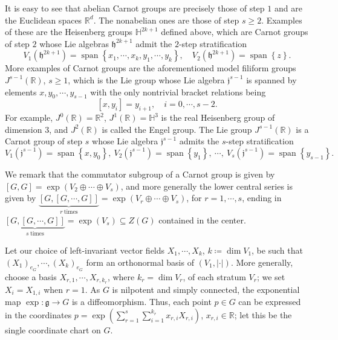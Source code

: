\documentclass[11pt,reqno]{amsart}
\newcommand{\1}{\mathbf 1}
\begin{document}
It is easy to see that abelian Carnot groups are precisely those of step $1$ and are the Euclidean spaces $\mathbb{R}^d$. The nonabelian ones are those of step $s\ge 2$. Examples of these are the Heisenberg groups $\mathbb{H}^{2k+1}$ defined above, which are Carnot groups of step $2$ whose Lie algebras $\mathfrak{h}^{2k+1}$ admit the $2$-step stratification
\[
V_1\left(\mathfrak{h}^{2k+1}\right)=\operatorname{span}\left\{x_1,\cdots,x_k,y_1,\cdots,y_k\right\}, \quad V_2\left(\mathfrak{h}^{2k+1}\right)=\operatorname{span}\left\{z\right\}.
\]
More examples of Carnot groups are the aforementioned model filiform groups $J^{s-1}\left(\mathbb{R}\right)$, $s\ge 1$,  which is the Lie group whose Lie algebra $\mathfrak{j}^{s-1}$ is spanned by elements $x,y_0,\cdots,y_{s-1}$ with the only nontrivial bracket relations being
\[
\left[x,y_i\right]=y_{i+1},\quad i=0,\cdots,s-2.
\]
For example, $J^0\left(\mathbb{R}\right)=\mathbb{R}^2$, $J^1\left(\mathbb{R}\right)= \mathbb{H}^3$ is the real Heisenberg group of dimension $3$, and $J^2\left(\mathbb{R}\right)$ is called the Engel group. The Lie group $J^{s-1}\left(\mathbb{R}\right)$ is a Carnot group of step $s$ whose Lie algebra $\mathfrak{j}^{s-1}$ admits the $s$-step stratification
\[
V_1\left(\mathfrak{j}^{s-1}\right)=\operatorname{span}\left\{x,y_0\right\},~ V_2\left(\mathfrak{j}^{s-1}\right)=\operatorname{span}\left\{y_1\right\}, ~\cdots,~ V_s\left(\mathfrak{j}^{s-1}\right)=\operatorname{span}\left\{y_{s-1}\right\}.
\]

We remark that the commutator subgroup of a Carnot group is given by $\left[G,G\right]=\exp\left(V_2\oplus\cdots\oplus V_s\right)$, and more generally the lower central series is given by  $\underbrace{\left[G,\left[G,\cdots,G\right]\right]}_{r~\mathrm{times}}=\exp\left(V_r\oplus\cdots\oplus V_s\right)$, for $r=1,\cdots,s$, ending in $\underbrace{\left[G,\left[G,\cdots,G\right]\right]}_{s~\mathrm{times}}=\exp\left(V_s\right)\subseteq Z\left(G\right)$ contained in the center. 

Let our choice of left-invariant vector fields $X_1,\cdots,X_k$, $k\coloneqq \operatorname{dim}V_1$, be such that $\left(X_1\right)_{e_G},\cdots, \left(X_k\right)_{e_G}$ form an orthonormal basis of $\left(V_1,\left|\cdot \right|\right)$. More generally, choose a basis $X_{r,1},\cdots, X_{r,k_r}$, where $k_r=\dim V_r$, of each stratum $V_r$; we set $X_i=X_{1,i}$ when $r=1$. As $G$ is nilpotent and simply connected, the exponential map $\exp:\mathfrak{g}\to G$ is a diffeomorphism. Thus, each point $p\in G$ can be expressed in the coordinates $p=\exp\left(\sum_{r=1}^s\sum_{i=1}^{k_r}x_{r,i}X_{r,i}\right)$, $x_{r,i}\in \mathbb{R}$; let this be the single coordinate chart on $G$. 
\end{document}
